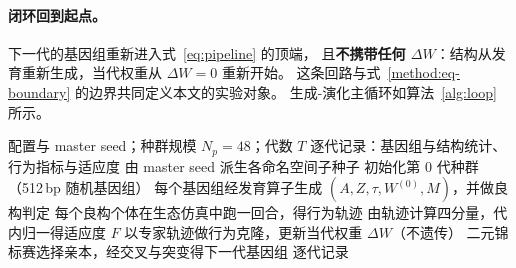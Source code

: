 \paragraph{闭环回到起点。}下一代的基因组重新进入式~\eqref{eq:pipeline} 的顶端，
且\textbf{不携带任何 $\Delta W$}：结构从发育重新生成，当代权重从 $\Delta W=0$ 重新开始。
这条回路与式~\eqref{method:eq-boundary} 的边界共同定义本文的实验对象。
生成-演化主循环如算法~\ref{alg:loop} 所示。

\begin{algorithm}[H]
\caption{生成-演化主循环}\label{alg:loop}
\begin{algorithmic}[1]
\Require 配置与 master seed；种群规模 $N_p=48$；代数 $T$
\Ensure 逐代记录：基因组与结构统计、行为指标与适应度
\State 由 master seed 派生各命名空间子种子
\State 初始化第 $0$ 代种群（512\,bp 随机基因组）
  \State 每个基因组经发育算子生成 $(A,Z,\tau,W^{(0)},M)$，并做良构判定
  \State 每个良构个体在生态仿真中跑一回合，得行为轨迹
  \State 由轨迹计算四分量，代内归一得适应度 $F$
    \State 以专家轨迹做行为克隆，更新当代权重 $\Delta W$（不遗传）
  \EndIf
  \State 二元锦标赛选择亲本，经交叉与突变得下一代基因组
\EndFor
\State \Return 逐代记录
\end{algorithmic}
\end{algorithm}
